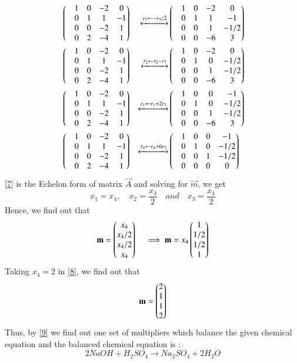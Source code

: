 \documentclass[journal,12pt,twocolumn]{IEEEtran}
\begin{document}
\begin{align}
 &\begin{pmatrix}&1 &0 &-2 &0 \\ &0 &1 &1 &-1 \\ &0 &0 &-2 &1 \\&0 &2 &-4 &1\end{pmatrix} &\xleftrightarrow[]{r_3 \leftarrow -r_3/2} &\begin{pmatrix}&1 &0 &-2 &0 \\ &0 &1 &1 &-1 \\ &0 &0 &1 &-1/2 \\&0 &0 &-6 &3\end{pmatrix}\\
 &\begin{pmatrix}&1 &0 &-2 &0 \\ &0 &1 &1 &-1 \\ &0 &0 &-2 &1 \\&0 &2 &-4 &1\end{pmatrix} 
 &\xleftrightarrow[]{r_2 \leftarrow r_2 - r_3 } &\begin{pmatrix}&1 &0 &-2 &0 \\ &0 &1 &0 &-1/2 \\ &0 &0 &1 &-1/2 \\&0 &0 &-6 &3\end{pmatrix} \\
 &\begin{pmatrix}&1 &0 &-2 &0 \\ &0 &1 &1 &-1 \\ &0 &0 &-2 &1 \\&0 &2 &-4 &1\end{pmatrix} 
 &\xleftrightarrow[]{r_1 \leftarrow r_1 + 2r_3 } &\begin{pmatrix}&1 &0 &0 &-1 \\ &0 &1 &0 &-1/2 \\ &0 &0 &1 &-1/2 \\&0 &0 &-6 &3\end{pmatrix} \\
 &\begin{pmatrix}&1 &0 &-2 &0 \\ &0 &1 &1 &-1 \\ &0 &0 &-2 &1 \\&0 &2 &-4 &1\end{pmatrix} 
 &\xleftrightarrow[]{r_4 \leftarrow r_4 + 6r_3 } &\begin{pmatrix}&1 &0 &0 &-1 \\ &0 &1 &0 &-1/2 \\ &0 &0 &1 &-1/2 \\&0 &0 &0 &0\end{pmatrix} \label{7}
\end{align}
 \ref{7} is the Echelon form of matrix $\vec{A}$ and solving for $\vec{m}$, we get
 \begin{equation}
 	x_1 = x_4,\quad x_2 = \frac{x_4}{2} \quad and \quad x_3 = \frac{x_4}{2} 
 \end{equation} 
Hence, we find out that
\begin{equation}\label{8}
	\mathbf{m} = \begin{pmatrix}x_4 \\ x_4/2 \\ x_4/2 \\ x_4\end{pmatrix} \quad \implies \mathbf{m} = x_4 \begin{pmatrix}1 \\ 1/2 \\ 1/2 \\1\end{pmatrix}
\end{equation}
Taking $x_4 =2$ in \ref{8}, we find out that
\begin{equation}\label{9}
	\mathbf{m} = \begin{pmatrix}2 \\ 1\\ 1\\ 2\end{pmatrix}
\end{equation}
Thus, by \ref{9} we find out one set of multipliers which balance the given chemical equation and the balanced chemical equation is :
\begin{equation*}
2NaOH + H_2SO_4 \xrightarrow{} Na_2SO_4  +  2H_2O	
\end{equation*}
\end{document}
